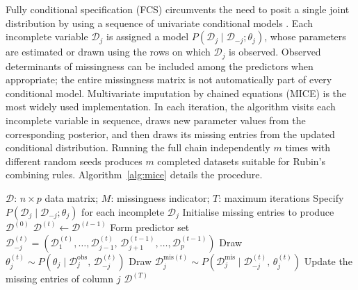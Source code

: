 Fully conditional specification (FCS) circumvents the need to posit a single joint distribution by using a sequence of univariate conditional models \citep{vanBuuren2006, white2011multiple}. Each incomplete variable $\mathcal{D}_j$ is assigned a model $P(\mathcal{D}_j\mid \mathcal{D}_{-j};\theta_j)$, whose parameters are estimated or drawn using the rows on which $\mathcal{D}_j$ is observed. Observed determinants of missingness can be included among the predictors when appropriate; the entire missingness matrix is not automatically part of every conditional model. Multivariate imputation by chained equations (MICE) \citep{van1999multiple} is the most widely used implementation. In each iteration, the algorithm visits each incomplete variable in sequence, draws new parameter values from the corresponding posterior, and then draws its missing entries from the updated conditional distribution. Running the full chain independently $m$ times with different random seeds produces $m$ completed datasets suitable for Rubin's combining rules. Algorithm~\ref{alg:mice} details the procedure.

\begin{algorithm}[t]
\caption{Multivariate imputation by chained equations (MICE)}
\label{alg:mice}
\begin{algorithmic}[1]
    \Require $\mathcal{D}$: $n \times p$ data matrix; $M$: missingness indicator;
             $T$: maximum iterations
    \State Specify $P(\mathcal{D}_j \mid \mathcal{D}_{-j};\theta_j)$ for each incomplete $\mathcal{D}_j$
    \State Initialise missing entries to produce $\mathcal{D}^{(0)}$
        \State $\mathcal{D}^{(t)} \gets \mathcal{D}^{(t-1)}$
            \State Form predictor set
                   $\mathcal{D}_{-j}^{(t)} = (\mathcal{D}_1^{(t)}, \ldots, \mathcal{D}_{j-1}^{(t)},\,
                   \mathcal{D}_{j+1}^{(t-1)}, \ldots, \mathcal{D}_p^{(t-1)})$
            \State Draw $\theta_j^{(t)} \sim
                   P(\theta_j \mid \mathcal{D}_j^{\mathrm{obs}},\,
                   \mathcal{D}_{-j}^{(t)})$
            \State Draw $\mathcal{D}_j^{\mathrm{mis}(t)} \sim
                   P(\mathcal{D}_j^{\mathrm{mis}} \mid
                   \mathcal{D}_{-j}^{(t)},\, \theta_j^{(t)})$
            \State Update the missing entries of column $j$
        \EndFor
    \EndFor
    \State \Return $\mathcal{D}^{(T)}$
\end{algorithmic}
\end{algorithm}

